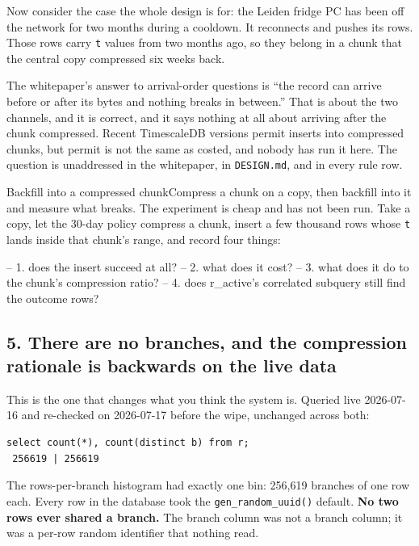 Now consider the case the whole design is for: the Leiden fridge PC has been off the network for two months during a cooldown. It reconnects and pushes its rows. Those rows carry \texttt{t} values from two months ago, so they belong in a chunk that the central copy compressed six weeks back.

The whitepaper's answer to arrival-order questions is ``the record can arrive before or after its bytes and nothing breaks in between.'' That is about the two channels, and it is correct, and it says nothing at all about arriving after the chunk compressed. Recent TimescaleDB versions permit inserts into compressed chunks, but permit is not the same as costed, and nobody has run it here. The question is unaddressed in the whitepaper, in \texttt{DESIGN.md}, and in every rule row.

\begin{Open}{Backfill into a compressed chunk}{Compress a chunk on a copy, then backfill into it and measure what breaks.}
The experiment is cheap and has not been run. Take a copy, let the 30-day policy compress a chunk, insert a few thousand rows whose \texttt{t} lands inside that chunk's range, and record four things:

\begin{Check}
-- 1. does the insert succeed at all?
-- 2. what does it cost?
-- 3. what does it do to the chunk's compression ratio?
-- 4. does r_active's correlated subquery still find the outcome rows?
\end{Check}
\end{Open}

\subsection{5. There are no branches, and the compression rationale is backwards on the live data}

This is the one that changes what you think the system is. Queried live 2026-07-16 and re-checked on 2026-07-17 before the wipe, unchanged across both:

\begin{verbatim}
select count(*), count(distinct b) from r;
 256619 | 256619
\end{verbatim}

The rows-per-branch histogram had exactly one bin: 256,619 branches of one row each. Every row in the database took the \texttt{gen\_random\_uuid()} default. \textbf{No two rows ever shared a branch.} The branch column was not a branch column; it was a per-row random identifier that nothing read.

